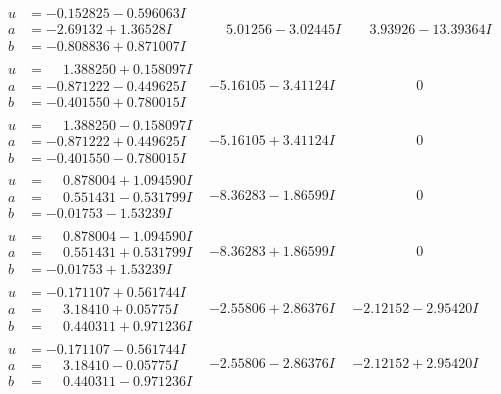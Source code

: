 \documentclass[1p]{elsarticle_modified}
\theoremstyle{definition}
\begin{document}
$$\begin{array}{c|c|c}
\begin{aligned}
u &= -0.152825 - 0.596063 I \\
a &= -2.69132 + 1.36528 I \\
b &= -0.808836 + 0.871007 I\end{aligned}
 & \phantom{-}5.01256 - 3.02445 I & \phantom{-}3.93926 - 13.39364 I \\ \hline\begin{aligned}
u &= \phantom{-}1.388250 + 0.158097 I \\
a &= -0.871222 - 0.449625 I \\
b &= -0.401550 + 0.780015 I\end{aligned}
 & -5.16105 - 3.41124 I & \phantom{-0.000000 } 0 \\ \hline\begin{aligned}
u &= \phantom{-}1.388250 - 0.158097 I \\
a &= -0.871222 + 0.449625 I \\
b &= -0.401550 - 0.780015 I\end{aligned}
 & -5.16105 + 3.41124 I & \phantom{-0.000000 } 0 \\ \hline\begin{aligned}
u &= \phantom{-}0.878004 + 1.094590 I \\
a &= \phantom{-}0.551431 - 0.531799 I \\
b &= -0.01753 - 1.53239 I\end{aligned}
 & -8.36283 - 1.86599 I & \phantom{-0.000000 } 0 \\ \hline\begin{aligned}
u &= \phantom{-}0.878004 - 1.094590 I \\
a &= \phantom{-}0.551431 + 0.531799 I \\
b &= -0.01753 + 1.53239 I\end{aligned}
 & -8.36283 + 1.86599 I & \phantom{-0.000000 } 0 \\ \hline\begin{aligned}
u &= -0.171107 + 0.561744 I \\
a &= \phantom{-}3.18410 + 0.05775 I \\
b &= \phantom{-}0.440311 + 0.971236 I\end{aligned}
 & -2.55806 + 2.86376 I & -2.12152 - 2.95420 I \\ \hline\begin{aligned}
u &= -0.171107 - 0.561744 I \\
a &= \phantom{-}3.18410 - 0.05775 I \\
b &= \phantom{-}0.440311 - 0.971236 I\end{aligned}
 & -2.55806 - 2.86376 I & -2.12152 + 2.95420 I \\ \hline\begin{aligned}

\end{aligned}
\end{array}$$
\end{document}
